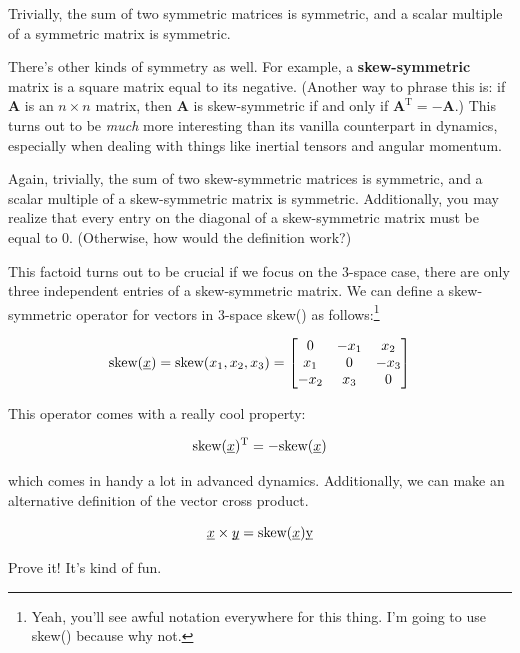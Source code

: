 \documentclass{report}
\begin{document}
\begin{onehalfspacing}
\begin{flushleft}
\medskip

Trivially, the sum of two symmetric matrices is symmetric, and a scalar multiple of a symmetric matrix is symmetric.

\medskip

There's other kinds of symmetry as well. For example, a \textbf{skew-symmetric} matrix is a square matrix equal to its negative. (Another way to phrase this is: if \textbf{A} is an \(n\times n\) matrix, then \textbf{A} is skew-symmetric if and only if \(\textbf{A}^\text{T} = -\textbf{A}\).) This turns out to be \textit{much} more interesting than its vanilla counterpart in dynamics, especially when dealing with things like inertial tensors and angular momentum.

\medskip

Again, trivially, the sum of two skew-symmetric matrices is symmetric, and a scalar multiple of a skew-symmetric matrix is symmetric. Additionally, you may realize that every entry on the diagonal of a skew-symmetric matrix must be equal to 0. (Otherwise, how would the definition work?) 

\medskip

This factoid turns out to be crucial if we focus on the 3-space case, there are only three independent entries of a skew-symmetric matrix. We can define a skew-symmetric operator for vectors in 3-space skew() as follows:\footnote{Yeah, you'll see awful notation everywhere for this thing. I'm going to use skew() because why not.}

\vspace{-0.1in}
\[\text{skew}(\underbar{\(x\)}) = \text{skew}(x_1, x_2, x_3) = \begin{bmatrix} 0 & -x_1 & x_2 \\ x_1 & 0 & -x_3 \\ -x_2 & x_3 & 0\end{bmatrix} \]

This operator comes with a really cool property:

\vspace{-0.1in}
\[\text{skew}(\underbar{\(x\)})^\text{T} = -\text{skew}(\underbar{\(x\)})\]

which comes in handy a lot in advanced dynamics. Additionally, we can make an alternative definition of the vector cross product.

\vspace{-0.1in}
\[\underbar{\(x\)} \times \underbar{\(y\)} = \text{skew}(\underbar{\(x\)}) \underbar{y}\]

Prove it! It's kind of fun.

\end{flushleft}
\end{onehalfspacing}
\end{document}
